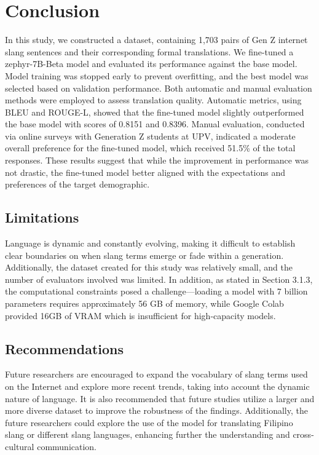 \chapter{Conclusion}
In this study, we constructed a dataset, containing 1,703 pairs of Gen Z internet slang sentences and their corresponding formal translations. We fine-tuned a zephyr-7B-Beta model and  evaluated its performance against the base model. Model training was stopped early to prevent overfitting, and the best model was selected based on validation performance. Both automatic and manual evaluation methods were employed to assess translation quality. Automatic metrics, using BLEU and ROUGE-L, showed that the fine-tuned model slightly outperformed the base model with scores of 0.8151 and 0.8396. Manual evaluation, conducted via online surveys with Generation Z students at UPV, indicated a moderate overall preference for the fine-tuned model, which received 51.5\% of the total responses. These	 results suggest that while the improvement in performance was not drastic, the fine-tuned model better aligned with the expectations and preferences of the target demographic.

\section{Limitations}
Language is dynamic and constantly evolving, making it difficult to establish clear boundaries on when slang terms emerge or fade within a generation. Additionally, the dataset created for this study was relatively small, and the number of evaluators involved was limited. In addition, as stated in Section 3.1.3, the computational constraints posed a challenge—loading a model with 7 billion parameters requires approximately 56 GB of memory, while Google Colab provided 16GB of VRAM which is insufficient for high-capacity models.

\section{Recommendations}
Future researchers are encouraged to expand the vocabulary of slang terms used on the Internet and explore more recent trends, taking into account the dynamic nature of language. It is also recommended that future studies utilize a larger and more diverse dataset to improve the robustness of the findings. Additionally, the future researchers could explore the use of the model for translating Filipino slang or different slang languages, enhancing further the understanding and cross-cultural communication.